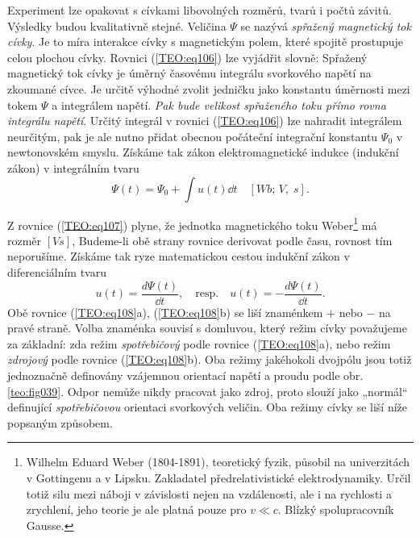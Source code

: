       Experiment lze opakovat s cívkami libovolných rozměrů, tvarů i počtů závitů. Výsledky budou
      kvalitativně stejné. Veličina \(\Psi\) se nazývá \emph{spřažený magnetický tok cívky}. Je to 
      míra interakce cívky s magnetickým polem, které spojitě prostupuje celou plochou cívky. 
      Rovnici (\ref{TEO:eq106}) lze vyjádřit slovně: Spřažený magnetický tok cívky je úměrný 
      časovému integrálu svorkového napětí na zkoumané cívce. Je určitě výhodné zvolit jedničku 
      jako konstantu úměrnosti mezi tokem \(\Psi\) a integrálem napětí. \emph{Pak bude velikost 
      spřaženého toku přímo rovna integrálu napětí}. Určitý integrál v rovnici 
      (\ref{TEO:eq106}) lze nahradit integrálem neurčitým, pak je ale nutno přidat obecnou 
      počáteční integrační konstantu \(\Psi_0\)
      v newtonovském smyslu. Získáme tak zákon elektromagnetické indukce (indukční zákon) v
      integrálním tvaru
      \begin{equation}\label{TEO:eq107}
       \Psi(t) = \Psi_0 + \int u(t)\dd{t} \quad [Wb;\, V,\; s].
      \end{equation}   
    
    Z rovnice (\ref{TEO:eq107}) plyne, že jednotka magnetického toku Weber\footnote{Wilhelm Eduard
    Weber (1804-1891), teoretický fyzik, působil na univerzitách v Gottingenu a v Lipsku. Zakladatel
    předrelativistické elektrodynamiky. Určil totiž silu mezi náboji v závislosti nejen na
    vzdálenosti, ale i na rychlosti a zrychlení, jeho teorie je ale platná pouze pro \(v \ll c\).
    Blízký spolupracovník Gausse.} má rozměr \([Vs]\), Budeme-li obě strany rovnice derivovat podle
    času, rovnost tím neporušíme. Získáme tak ryze matematickou cestou indukční zákon v
    diferenciálním tvaru
    \begin{equation}\label{TEO:eq108}
     u(t) = \frac{d\Psi(t)}{\dd{t}}, \quad \text{resp.} \quad  u(t) = -\frac{d\Psi(t)}{\dd{t}}.
    \end{equation}   
    Obě rovnice (\ref{TEO:eq108}a), (\ref{TEO:eq108}b) se liší znaménkem \(+\) nebo \(-\) na pravé
    straně. Volba znaménka souvisí s domluvou, který režim cívky považujeme za základní: zda režim
    \emph{spotřebičový} podle rovnice (\ref{TEO:eq108}a), nebo režim \emph{zdrojový} podle rovnice
    (\ref{TEO:eq108}b). Oba režimy jakéhokoli dvojpólu jsou totiž jednoznačně definovány vzájemnou
    orientací napětí a proudu podle obr. \ref{teo:fig039}. Odpor nemůže nikdy pracovat jako zdroj,
    proto slouží jako „normál“ definující \emph{spotřebičovou} orientaci svorkových veličin. Oba
    režimy cívky se liší níže popsaným způsobem.

